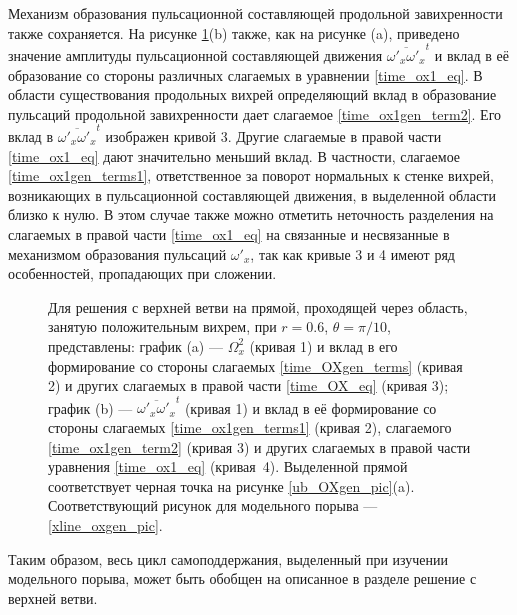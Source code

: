 Механизм образования пульсационной составляющей продольной завихренности также сохраняется. На рисунке \ref{ub_oxgen_lines_pic}(b) также, как на рисунке (a), приведено значение амплитуды пульсационной составляющей движения $\overline{\omega'_x\omega'_x}^t$ и вклад в её образование со стороны различных слагаемых в уравнении \eqref{time_ox1_eq}. В области существования продольных вихрей определяющий вклад в образование пульсаций продольной завихренности дает слагаемое \eqref{time_ox1gen_term2}. Его вклад в $\overline{\omega'_x\omega'_x}^t$ изображен кривой 3. Другие слагаемые в правой части \eqref{time_ox1_eq} дают значительно меньший вклад. В частности, слагаемое \eqref{time_ox1gen_terms1}, ответственное за поворот нормальных к стенке вихрей, возникающих в пульсационной составляющей движения, в выделенной области близко к нулю. В этом случае также можно отметить неточность разделения на слагаемых в правой части \eqref{time_ox1_eq} на связанные и несвязанные в механизмом образования пульсаций $\omega'_x$, так как кривые 3 и 4 имеют ряд особенностей, пропадающих при сложении.

\begin{figure}
\caption{Для решения с верхней ветви на прямой, проходящей через область, занятую положительным вихрем, при $r = 0.6$, $\theta = \pi/10$, представлены: график (a) --- $\Omega_x^2$ (кривая 1) и вклад в его формирование со стороны слагаемых \eqref{time_OXgen_terms} (кривая 2) и других слагаемых в правой части \eqref{time_OX_eq} (кривая 3); график (b) --- $\overline{\omega'_x\omega'_x}^t$ (кривая 1) и вклад в её формирование со стороны слагаемых \eqref{time_ox1gen_terms1} (кривая 2), слагаемого \eqref{time_ox1gen_term2} (кривая 3) и других слагаемых в правой части уравнения \eqref{time_ox1_eq} (кривая~4). Выделенной прямой соответствует черная точка на рисунке \ref{ub_OXgen_pic}(a). Соответствующий рисунок для модельного порыва --- \ref{xline_oxgen_pic}.} 
\label{ub_oxgen_lines_pic}
\end{figure}

Таким образом, весь цикл самоподдержания, выделенный при изучении модельного порыва, может быть обобщен на описанное в разделе решение с верхней ветви. 

\begin{comment}
\begin{figure}
\center{\texttt{[image: ub\_ox1gen\_map.png]}}
\caption{Для решения с верхней ветви в сечении, где амплитуда пульсаций достигает наибольшей величины, представлена величина $\overline{\omega'_x \omega'_x}^t$ (график a) и вклад в её формирование со стороны слагаемых \eqref{time_ox1gen_terms1} (график b),  слагаемых  \eqref{time_ox1gen_term2} (график с) и других слагаемых в правой части уравнения \eqref{time_ox1_eq} (график d). }
\label{ub_ox1gen_pic}
\end{figure}
\end{comment}


